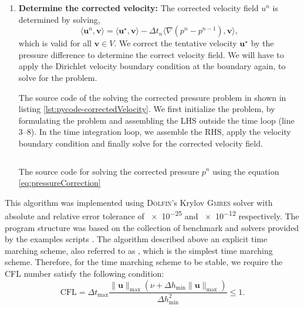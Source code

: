 \begin{enumerate}
	\item \textbf{Determine the corrected velocity:} The corrected velocity field $u^n$ is determined by solving,
		\begin{equation}
		\langle \mathbf{u}^n, \mathbf{v}\rangle = \langle \mathbf{u}^{\star},\mathbf{v} \rangle - \Delta t_n \langle \nabla(p^n - p^{n-1}),\mathbf{v} \rangle,
		\end{equation}
	which is valid for all $\mathbf{v} \in V$. We correct the tentative velocity $\mathbf{u}^{\star}$ by the pressure difference to determine the correct velocity field. We will have to apply the Dirichlet velocity boundary condition at the boundary again, to solve for the problem.
	
	The source code of the solving the corrected pressure problem in shown in listing \ref{lst:pycode-correctedVelocity}.
	We first initialize the problem, by formulating the problem and assembling the LHS outside the time loop (line \numrange{3}{8}). In the time integration loop, we assemble the RHS, apply the velocity boundary condition and finally solve for the corrected velocity field.
	
		\begin{listing}[p]
		\inputminted[fontseries=courier,obeytabs,fontsize=\scriptsize,mathescape,linenos,numbersep=5pt,frame=lines,framesep=2mm,xleftmargin=20mm,xrightmargin=20mm]{python}{figures/eulerian/correctedVelocity.py}
		\caption{The source code for solving the corrected pressure $p^n$ using the equation \ref{eq:pressureCorrection}}
		\label{lst:pycode-correctedVelocity}
		\end{listing}
		
	\end{enumerate}
	
This algorithm was implemented using \textsc{Dolfin}'s Krylov \textsc{Gmres} solver with absolute and relative error tolerance of \num{e-25} and \num{e-12} respectively. The program structure was based on the collection of benchmark and solvers provided by the \fenics examples scripts \cite{nsbench}. The algorithm described above an explicit time marching scheme, also referred to as , which is the simplest time marching scheme. Therefore, for the time marching scheme to be stable, we require the CFL number satisfy the following condition:
	\begin{equation}
	\mathrm{CFL} = \Delta t_{\mathrm{max}} \frac{\lVert\mathbf{u}\rVert_{\mathrm{max}}(\nu +  \Delta h_{\mathrm{min}}\lVert\mathbf{u}\rVert_{\mathrm{max}})}{\Delta h_{\mathrm{min}}^2} \le 1.
	\label{eq:cfl}
	\end{equation}
	
